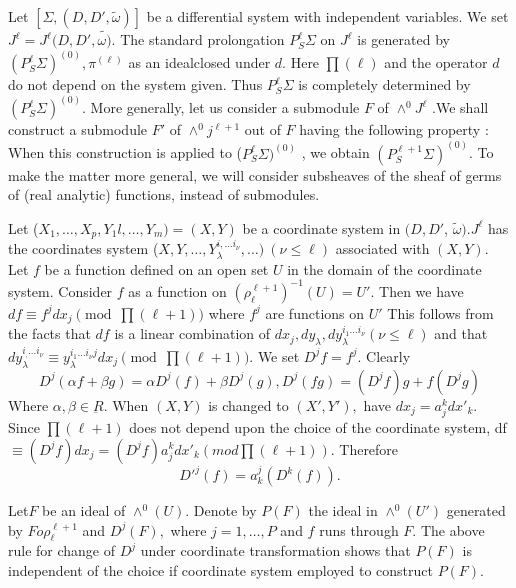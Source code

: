 \section{}\label{chap3:sec3.15}%
 
Let $ [\Sigma, (D, D', \tilde{\omega})]$ be a differential system with
independent variables. We set $J^\ell = J^\ell(D, D',
\tilde{\omega)}$. The standard prolongation $P^\ell_S \Sigma$ on
$J^\ell$ is generated by $(P^\ell_S \Sigma)^{(0)}, \pi ^{(\ell)} $ as
an ideal\pageoriginale closed  under $d$. Here $\prod(\ell)$ and the operator $d$ do
not depend on the system given. Thus $P^\ell_S \Sigma$ is completely
determined by $(P^\ell_S \Sigma)^{(0)}$. More generally, let us
consider a submodule $F$ of $\wedge^0 J^\ell$ .We shall construct a
submodule $F'$ of $\wedge^0j^{\ell+1}$ out of  $F$ having the
following property : When this construction is applied to ($P^\ell_S
\Sigma)^{(0)}$ , we obtain $(P^{\ell+1}_S \Sigma)^{(0)}$. To make the
matter more general, we will consider subsheaves of the sheaf of germs
of (real analytic) functions, instead of submodules. 
 
Let ($X_1,\ldots , X_p,Y_1l,\ldots,Y_m) = (X,Y) $ be a coordinate system in 
$ (D, D'$, $\tilde{\omega}). J^\ell$ has the coordinates system ($
X,Y,\ldots,Y_\lambda ^{i,\ldots i_\nu},\ldots)~(\nu \leq \ell)$
associated with $(X,Y) $. Let $f$ be a function defined on an open set
$U$ in the domain of the coordinate system. Consider $f$ as a function
on $(\rho^{\ell+1}_\ell)^{-1}(U)=U' $. Then we have $df \equiv f^j
dx_j \pmod{\prod(\ell + 1)}$ where $f^j$ are functions on $U'$
This follows from the facts that $df$ is a linear combination of
$dx_j,dy_\lambda, dy_\lambda^{i_1\ldots i_\nu}(\nu \leq \ell)$ and
  that $dy^{i_,\ldots i_\nu }_\lambda \equiv y_\lambda ^{i_1\ldots i_\nu j }
dx_j \pmod {\prod (\ell+1)}$. We set $D^j f= f^j$. Clearly 
$$
D^j(\alpha f+ \beta g) = \alpha D^j (f) + \beta D^j(g) , D^j (fg)=
(D^jf) g + f(D^jg)   
$$
Where $\alpha , \beta \in \underbar{R}$. When $(X,Y) $ is changed to
$(X',Y') , $ have $dx_j = a^k _j dx'_k$. Since $\prod (\ell+1) $ does
not depend upon the choice of the coordinate system, df$
\equiv(D^jf)dx_j = (D^j f ) a^k _j dx'_k (mod \prod (\ell+1))$. 
Therefore 
$$
D'^j (f) = a^j_k (D^k(f)). 
$$

Let\pageoriginale $F$ be an ideal of $\wedge^0(U)$. Denote by $P(F)$ the ideal in
$\wedge^0(U') $ generated by $F o \rho^{\ell+1}_\ell$ and $D^j (F) ,
$ where $j=1,\ldots,P$ and $f$ runs through $F$. The above rule for
change of $D^j$ under coordinate transformation shows that $P(F) $ is
independent of the choice if coordinate system employed to construct
$P(F)$.  

